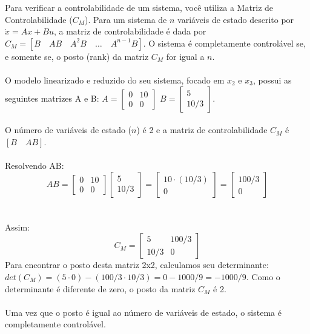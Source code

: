 \documentclass[a4paper,11pt]{article}
\begin{document}
Para verificar a controlabilidade de um sistema, você utiliza a Matriz de Controlabilidade ($C_M$). Para um sistema de $n$ variáveis de estado descrito por $\dot{x} = Ax + Bu$, a matriz de controlabilidade é dada por $C_M = [B \quad AB \quad A^2B \quad \dots \quad A^{n-1}B]$. O sistema é completamente controlável se, e somente se, o posto (rank) da matriz $C_M$ for igual a $n$.
\\\\
O modelo linearizado e reduzido do seu sistema, focado em $x_2$ e $x_3$, possui as seguintes matrizes A e B: $A = \begin{bmatrix} 0 & 10 \\ 0 & 0 \end{bmatrix}$ $B = \begin{bmatrix} 5 \\ 10/3 \end{bmatrix}$.
\\\\
O número de variáveis de estado ($n$) é 2 e a matriz de controlabilidade $C_M$ é $[B \quad AB]$.
\\\\
Resolvendo AB:
\[
 AB = \begin{bmatrix} 0 & 10 \\ 0 & 0 \end{bmatrix} \begin{bmatrix} 5 \\ 10/3 \end{bmatrix} = \begin{bmatrix} 10 \cdot (10/3) \\ 0 \end{bmatrix} = \begin{bmatrix} 100/3 \\ 0 \end{bmatrix}
\]
 \\\\
 Assim:
 \[
    C_M = \begin{bmatrix} 5 & 100/3 \\ 10/3 & 0 \end{bmatrix}
 \]
 Para encontrar o posto desta matriz 2x2, calculamos seu determinante: $det(C_M) = (5 \cdot 0) - (100/3 \cdot 10/3) = 0 - 1000/9 = -1000/9$. Como o determinante é diferente de zero, o posto da matriz $C_M$ é 2.
 \\\\
Uma vez que o posto é igual ao número de variáveis de estado, o sistema é completamente controlável.
\\\\
\end{document}
